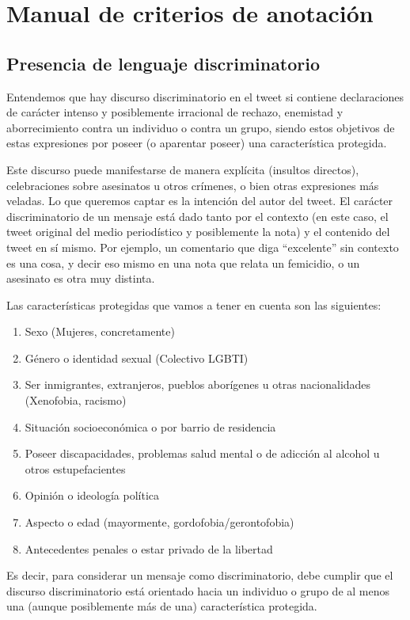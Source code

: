 \chapter{Manual de criterios de anotación}
\label{app:manual_criterios_anotacion}
\section{Presencia de lenguaje discriminatorio}

Entendemos que hay discurso discriminatorio en el tweet si contiene declaraciones de carácter intenso y posiblemente irracional de rechazo, enemistad y aborrecimiento contra un individuo o contra un grupo, siendo estos objetivos de estas expresiones por poseer (o aparentar poseer) una característica protegida.

Este discurso puede manifestarse de manera explícita (insultos directos), celebraciones sobre asesinatos u otros crímenes, o bien otras expresiones más veladas. Lo que queremos captar es la intención del autor del tweet. El carácter discriminatorio de un mensaje está dado tanto por el contexto (en este caso, el tweet original del medio periodístico y posiblemente la nota) y el contenido del tweet en sí mismo. Por ejemplo, un comentario que diga “excelente” sin contexto es una cosa, y decir eso mismo en una nota que relata un femicidio, o un asesinato es otra muy distinta.

Las características protegidas que vamos a tener en cuenta son las siguientes:

\begin{enumerate}
\item Sexo (Mujeres, concretamente)
\item Género o identidad sexual (Colectivo LGBTI)
\item Ser inmigrantes, extranjeros, pueblos aborígenes u otras nacionalidades (Xenofobia, racismo)
\item Situación socioeconómica o por barrio de residencia
\item Poseer discapacidades, problemas salud mental o de adicción al alcohol u otros estupefacientes
\item Opinión o ideología política
\item Aspecto o edad (mayormente, gordofobia/gerontofobia)
\item Antecedentes penales o estar privado de la libertad

\end{enumerate}

Es decir, para considerar un mensaje como discriminatorio, debe cumplir que el discurso discriminatorio está orientado hacia un individuo o grupo de al menos una (aunque posiblemente más de una) característica protegida.


